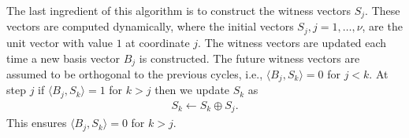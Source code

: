 \documentclass[fleqn,11pt]{article}
\begin{document}
The last ingredient of this algorithm is to construct the witness vectors $S_j$. 
These vectors are computed dynamically, where the initial vectors $S_j,j=1,\hdots,\nu$, are the unit vector with value $1$ at coordinate $j$.
The witness vectors are updated each time a new basis vector $B_j$ is constructed. 
The future witness vectors are assumed to be orthogonal to the previous cycles, i.e., $\langle B_j,S_k\rangle=0$ for $j<k$.
At step $j$ if $\langle B_j,S_k\rangle=1$ for $k>j$ then we update $S_k$ as%
\begin{align}
	S_k \gets S_k\oplus S_j.
\end{align}
This ensures $\langle B_j,S_k\rangle=0$ for $k>j$.
\end{document}
